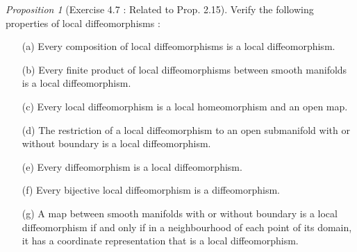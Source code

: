 \documentclass[a4paper]{article}
\theoremstyle{remark}
\newtheorem{prop}{Proposition}
\begin{document}
\begin{prop}[Exercise 4.7 \cite{LeeSM} : Related to Prop. 2.15]
Verify the following properties of local diffeomorphisms :
\begin{enumerate}[nolistsep]
\item[(a)] Every composition of local diffeomorphisms is a local diffeomorphism.
\item[(b)] Every finite product of local diffeomorphisms between smooth manifolds is a local diffeomorphism. 
\item[(c)] Every local diffeomorphism is a local homeomorphism and an open map.
\item[(d)] The restriction of a local diffeomorphism to an open submanifold with or without boundary is a local diffeomorphism.
\item[(e)] Every diffeomorphism is a local diffeomorphism.
\item[(f)] Every bijective local diffeomorphism is a diffeomorphism.
\item[(g)] A map between smooth manifolds with or without boundary is a local diffeomorphism if and only if in a neighbourhood of each point of its domain, it has a coordinate representation that is a local diffeomorphism. 
\end{enumerate}
\end{prop}
\end{document}
